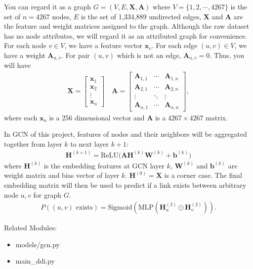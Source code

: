 \documentclass{article}
\newcommand{\mA}{\bm{A}}
\newcommand{\mH}{\bm{H}}
\newcommand{\mW}{\bm{W}}
\newcommand{\mX}{\bm{X}}
\newcommand{\vb}{\bm{b}}
\newcommand{\vx}{\bm{x}}
\begin{document}
%
You can regard it as a graph $G = (V, E, \mX, \mA)$ where $V = \{1, 2, \cdots,
4267\}$ is the set of $n = 4267$ nodes, $E$ is the set of 1,334,889 undirected
edges, $\mX$ and $\mA$ are the feature and weight matrices assigned to the
graph.
%
Although the raw dataset has no node attributes, we will regard it as an
attributed graph for convenience.
%
For each node $v \in V$, we have a feature vector $\vx_{v}$.
For each edge $(u, v) \in V$, we have a weight $\mA_{u, v}$.
For pair $(u, v)$ which is not an edge, $\mA_{u, v} = 0$.
%
Thus, you will have
%
\begin{align}
%
    \mX = \begin{bmatrix}
        \vx_{1} \\
        \vx_{2} \\
        \vdots \\
        \vx_{n}
    \end{bmatrix} \quad \mA = \begin{bmatrix}
        \mA_{1, 1} & \cdots & \mA_{1, n} \\
        \mA_{2, 1} & \cdots & \mA_{2, n} \\
        \vdots & \ddots & \vdots \\
        \mA_{n, 1} & \cdots & \mA_{n, n}
    \end{bmatrix},
%
\end{align}
%
where each $\vx_{u}$ is a 256 dimensional vector and $\mA$ is a $4267 \times
4267$ matrix.

%
\hfill

%
In GCN of this project, features of nodes and their neighbors will be
aggregated together from layer $k$ to next layer $k + 1$:
%
\begin{align}
\label{eqn:gcn}
%
    \mH^{(k + 1)} = \text{ReLU}\big( \mA \mH^{(k)} \mW^{(k)} + \vb^{(k)}\big)
%
\end{align}
%
where $\mH^{(k)}$ is the embedding features at GCN layer $k$, $\mW^{(k)}$ and
$\vb^{(k)}$ are weight matrix and bias vector of layer $k$.
$\mH^{(0)} = \mX$ is a corner case.
%
The final embedding matrix will then be used to predict if a link exists
between arbitrary node $u, v$ for graph $G$.
%
\begin{align*}
%
    P(\text{$(u, v)$ exists}) = \text{Sigmoid}(\text{MLP}(\mH^{(2)}_{u} \odot
    \mH^{(2)}_{v})).
%
\end{align*}

%
\hfill

%
\noindent Related Modules:
%
\begin{itemize}
%
\item
    models/gcn.py
\item
    main\_ddi.py
%
\end{itemize}
\end{document}

